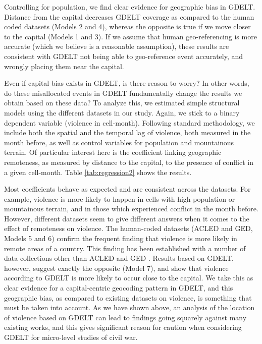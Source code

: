 \documentclass[hidelinks]{article}
\begin{document}
Controlling for population, we find clear evidence for geographic bias in GDELT. Distance from the capital decreases GDELT coverage as compared to the human coded datasets (Models 2 and 4), whereas the opposite is true if we move closer to the capital (Models 1 and 3). If we assume that human geo-referencing is more accurate (which we believe is a reasonable assumption), these results are consistent with GDELT not being able to geo-reference event accurately, and wrongly placing them near the capital. 

Even if capital bias exists in GDELT, is there reason to worry? In other words, do these misallocated events in GDELT fundamentally change the results we obtain based on these data? To analyze this, we estimated simple structural models using the different datasets in our study. Again, we stick to a binary dependent variable (violence in cell-month). Following standard methodology, we include both the spatial and the temporal lag of violence, both measured in the month before, as well as control variables for population and mountainous terrain. Of particular interest here is the coefficient linking geographic remoteness, as measured by distance to the capital, to the presence of conflict in a given cell-month. Table \ref{tab:regression2} shows the results. 

Most coefficients behave as expected and are consistent across the datasets. For example, violence is more likely to happen in cells with high population or mountainous terrain, and in those which experienced conflict in the month before. However, different datasets seem to give different answers when it comes to the effect of remoteness on violence. The human-coded datasets (ACLED and GED, Models 5 and 6) confirm the frequent finding that violence is more likely in remote areas of a country. This finding has been established with a number of data collections other than ACLED and GED \citep{buhaug06localdeterminants, buhaug08disaggregating}. Results based on GDELT, however, suggest exactly the opposite (Model 7), and show that violence according to GDELT is more likely to occur close to the capital. We take this as clear evidence for a capital-centric geocoding pattern in GDELT, and this geographic bias, as compared to existing datasets on violence, is something that must be taken into account. As we have shown above, an analysis of the location of violence based on GDELT can lead to findings going squarely against many existing works, and this gives significant reason for caution when considering GDELT for micro-level studies of civil war.
\end{document}
